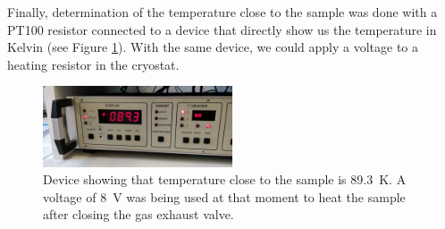 \documentclass[11pt,a4paper]{article}
\begin{document}
Finally, determination of the temperature close to the sample was done with a PT100 resistor connected to a device that directly show us the temperature in Kelvin (see Figure \ref{fig:temperature_device}). With the same device, we could apply a voltage to a heating resistor in the cryostat.

\begin{figure}[H]
\centering
\includegraphics[width=0.5\textwidth]{temperature_device}
\caption{Device showing that temperature close to the sample is \SI{89.3}{\kelvin}. A voltage of \SI{8}{\volt} was being used at that moment to heat the sample after closing the gas exhaust valve.}
\label{fig:temperature_device}
\end{figure}
\end{document}

